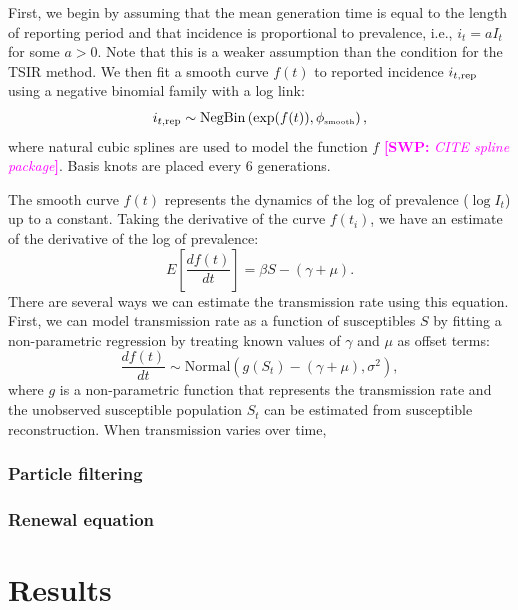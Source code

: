 \documentclass{article}
\newcommand{\comment}[3]{\textcolor{#1}{\textbf{[#2: }\textsl{#3}\textbf{]}}}
\newcommand{\swp}[1]{\comment{magenta}{SWP}{#1}}
\newcommand{\tsub}[2]{#1_{{\textrm{\tiny #2}}}}
\begin{document}
First, we begin by assuming that the mean generation time is equal to the length of reporting period and that incidence is proportional to prevalence, i.e., $i_t = a I_t$ for some $a > 0$. 
Note that this is a weaker assumption than the condition for the TSIR method.
We then fit a smooth curve $f(t)$ to reported incidence $i_{t, {\tiny \textrm{rep}}}$ using a negative binomial family with a log link:
\begin{equation}
i_{t, {\tiny \textrm{rep}}} \sim \mathrm{NegBin}\left(\exp (f(t)), \tsub{\phi}{smooth} \right),
\end{equation}
where natural cubic splines are used to model the function $f$ \swp{CITE spline package}.
Basis knots are placed every 6 generations.

The smooth curve $f(t)$ represents the dynamics of the log of prevalence ($\log I_t$) up to a constant.
Taking the derivative of the curve $f(t_i)$, we have an estimate of the derivative of the log of prevalence:
\begin{equation}
E\left[\frac{df(t)}{dt}\right] = \beta S - (\gamma + \mu).
\end{equation}
There are several ways we can estimate the transmission rate using this equation.
First, we can model transmission rate as a function of susceptibles $S$ by fitting a non-parametric regression by treating known values of $\gamma$ and $\mu$ as offset terms:
\begin{equation}
\frac{df(t)}{dt} \sim \mathrm{Normal}(g(S_t) - (\gamma + \mu), \sigma^2),
\end{equation}
where $g$ is a non-parametric function that represents the transmission rate and the unobserved susceptible population $S_t$ can be estimated from susceptible reconstruction.
When transmission varies over time, 



\subsubsection*{Particle filtering}



\subsubsection*{Renewal equation}



\section{Results}
\end{document}
